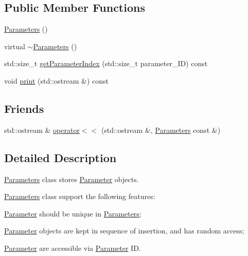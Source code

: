 \subsection*{Public Member Functions}
\begin{DoxyCompactItemize}
\item 
\mbox{\hyperlink{classanen_par_1_1_parameters_a413c34a4d0d252b55efdc30e27707e32}{Parameters}} ()
\item 
virtual \mbox{\hyperlink{classanen_par_1_1_parameters_aab183145d25096bc5b3e2ae2b0fa5532}{$\sim$\+Parameters}} ()
\item 
std\+::size\+\_\+t \mbox{\hyperlink{classanen_par_1_1_parameters_a4739a165ec7ff10b49dc00ec0784c8eb}{get\+Parameter\+Index}} (std\+::size\+\_\+t parameter\+\_\+\+ID) const
\item 
void \mbox{\hyperlink{classanen_par_1_1_parameters_acc1ebdd412b4b9d34e121fc0910c7952}{print}} (std\+::ostream \&) const
\end{DoxyCompactItemize}
\subsection*{Friends}
\begin{DoxyCompactItemize}
\item 
std\+::ostream \& \mbox{\hyperlink{classanen_par_1_1_parameters_a8ffabb0f94a5698a8a711fa5c449e622}{operator$<$$<$}} (std\+::ostream \&, \mbox{\hyperlink{classanen_par_1_1_parameters}{Parameters}} const \&)
\end{DoxyCompactItemize}


\subsection{Detailed Description}
\mbox{\hyperlink{classanen_par_1_1_parameters}{Parameters}} class stores \mbox{\hyperlink{classanen_par_1_1_parameter}{Parameter}} objects. 

\mbox{\hyperlink{classanen_par_1_1_parameters}{Parameters}} class support the following features\+:
\begin{DoxyEnumerate}
\item \mbox{\hyperlink{classanen_par_1_1_parameter}{Parameter}} should be unique in \mbox{\hyperlink{classanen_par_1_1_parameters}{Parameters}};
\item \mbox{\hyperlink{classanen_par_1_1_parameter}{Parameter}} objects are kept in sequence of insertion, and has random access;
\item \mbox{\hyperlink{classanen_par_1_1_parameter}{Parameter}} are accessible via \mbox{\hyperlink{classanen_par_1_1_parameter}{Parameter}} ID. 
\end{DoxyEnumerate}

